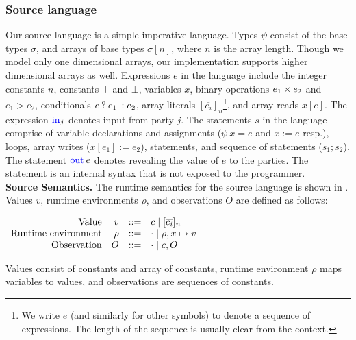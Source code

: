 \subsubsection*{Source language} Our source language
 is a simple imperative language.  Types
$\psi$ consist of the base types $\sigma$, and arrays
of base types $\sigma[n]$, where $n$ is the array length. Though we
model only one dimensional arrays, our implementation supports higher
dimensional arrays as well. Expressions $e$ in the language include the
integer constants $n$,  constants $\top$ and $\bot$,
variables $x$, binary operations $e_{1} \times e_{2}$ and $e_{1} > e_{2}$,
conditionals ${{e}\:?\:{e_{1}}\::{e_{2}}}$, array literals 
$[\overline{e_{i}}]_{n}$\footnote{We write $\overline{e}$ (and
  similarly for other symbols) to denote a sequence of expressions.
The length of the sequence is usually clear from the context.}, and
array reads $x[e]$. The expression $\kw{in}_{j}$ denotes input from
party $j$. The statements $s$ in the language comprise of variable
declarations and assignments ($\psi\:x = e$ and $x := e$ resp.),
 loops, array writes ($x[e_{1}] := e_{2}$), 
statements, and sequence of statements ($s_{1}; s_{2}$). The statement
$\kw{out}\:e$ denotes revealing the value of $e$ to the
parties. The  statement is an internal syntax that is not
exposed to the programmer. \\

\noindent\textbf{Source Semantics.} The runtime semantics for the source language is shown in
.  Values $v$, runtime environments $\rho$, and
observations $O$ are defined as follows:

\vspace{0.2cm}
$
\small
\begin{array}{rrcl}
    \ftext{Value} & v &::=& c \mid [\overline{c_{i}}]_{n}\\
    \ftext{Runtime environment} & \rho &::=& \cdot \mid \rho,x \mapsto v\\
    \ftext{Observation} & O & ::= & \cdot \mid c, O \\
\end{array}
$

\vspace{0.2cm}
Values consist of constants and array of constants, runtime environment
$\rho$ maps variables to values, and observations are sequences of
constants.

